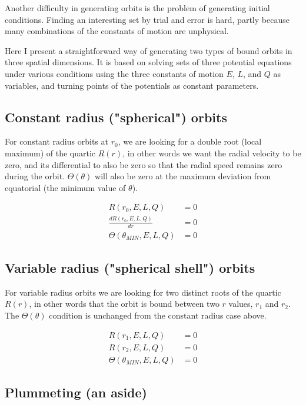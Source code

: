 \documentclass[11pt]{article}
\begin{document}
Another difficulty in generating orbits is the problem of generating initial conditions.  Finding an interesting set by trial and error is hard, partly because many combinations of the constants of motion are unphysical.

Here I present a straightforward way of generating two types of bound orbits in three spatial dimensions.  It is based on solving sets of three potential equations under various conditions using the three constants of motion $E$, $L$, and $Q$ as variables, and turning points of the potentials as constant parameters.

\subsection{Constant radius ("spherical") orbits}

For constant radius orbits at $r_0$, we are looking for a double root (local maximum) of the quartic $R(r)$, in other words we want the radial velocity to be zero, and its differential to also be zero so that the radial speed remains zero during the orbit.  $\Theta (\theta)$ will also be zero at the maximum deviation from equatorial (the minimum value of $\theta$).

\begin{align}
R(r_0, E, L, Q) &= 0 \\
\frac{d R(r_0, E, L, Q)}{d r} &= 0 \\
\Theta(\theta_{MIN}, E, L, Q) &= 0
\end{align}

\subsection{Variable radius ("spherical shell") orbits}

For variable radius orbits we are looking for two distinct roots of the quartic $R(r)$, in other words that the orbit is bound between two $r$ values, $r_1$ and $r_2$.  The $\Theta (\theta)$ condition is unchanged from the constant radius case above.

\begin{align}
R(r_1, E, L, Q) &= 0 \\
R(r_2, E, L, Q) &= 0 \\
\Theta(\theta_{MIN}, E, L, Q) &= 0
\end{align}

\subsection{Plummeting (an aside)}
\end{document}
